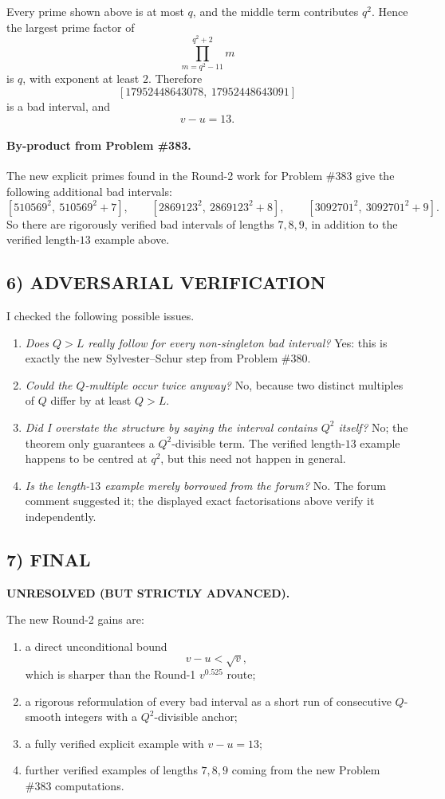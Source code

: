 Every prime shown above is at most $q$, and the middle term contributes $q^2$. Hence the largest prime factor of
\[
\prod_{m=q^2-11}^{q^2+2} m
\]
is $q$, with exponent at least $2$. Therefore
\[
[17952448643078,\ 17952448643091]
\]
is a bad interval, and
\[
v-u=13.
\]

\paragraph{By-product from Problem \#383.}
The new explicit primes found in the Round-2 work for Problem \#383 give the following additional bad intervals:
\[
[510569^2,\ 510569^2+7],\qquad
[2869123^2,\ 2869123^2+8],\qquad
[3092701^2,\ 3092701^2+9].
\]
So there are rigorously verified bad intervals of lengths $7,8,9$, in addition to the verified length-$13$ example above.

\subsection*{6) ADVERSARIAL VERIFICATION}

I checked the following possible issues.

\begin{enumerate}
\item \emph{Does $Q>L$ really follow for every non-singleton bad interval?} Yes: this is exactly the new Sylvester--Schur step from Problem \#380.
\item \emph{Could the $Q$-multiple occur twice anyway?} No, because two distinct multiples of $Q$ differ by at least $Q>L$.
\item \emph{Did I overstate the structure by saying the interval contains $Q^2$ itself?} No; the theorem only guarantees a $Q^2$-divisible term. The verified length-$13$ example happens to be centred at $q^2$, but this need not happen in general.
\item \emph{Is the length-$13$ example merely borrowed from the forum?} No. The forum comment suggested it; the displayed exact factorisations above verify it independently.
\end{enumerate}

\subsection*{7) FINAL}

\textbf{UNRESOLVED (BUT STRICTLY ADVANCED).}

The new Round-2 gains are:

\begin{enumerate}
\item a direct unconditional bound
\[
v-u<\sqrt{v},
\]
which is sharper than the Round-1 $v^{0.525}$ route;
\item a rigorous reformulation of every bad interval as a short run of consecutive $Q$-smooth integers with a $Q^2$-divisible anchor;
\item a fully verified explicit example with $v-u=13$;
\item further verified examples of lengths $7,8,9$ coming from the new Problem \#383 computations.
\end{enumerate}

